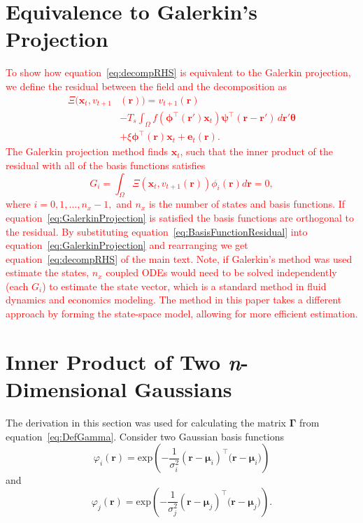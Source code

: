 \documentclass[review,authoryear,3p]{elsarticle}
\newcommand{\dean}[1]{\textcolor{red}{#1}}
\begin{document}
\section{Equivalence to Galerkin's Projection}\label{App:Galerkin}
\dean{To show how equation~\ref{eq:decompRHS} is equivalent to the Galerkin projection, we define the residual between the field and the decomposition as 
\begin{align}\label{eq:BasisFunctionResidual}
	\Xi(\mathbf{x}_t,v_{t+1}&(\mathbf{r})) = v_{t+1}(\mathbf{r}) \nonumber \\
	&- T_s\int_\Omega{f(\boldsymbol{\phi}^{\top}(\mathbf{r}')\mathbf{x}_t )\boldsymbol{\psi}^{\top}(\mathbf{r}-\mathbf{r}') \, d\mathbf{r}'}\boldsymbol{\theta} \nonumber \\
	&+ \xi\boldsymbol{\phi}^{\top}(\mathbf{r})\mathbf{x}_t + \mathbf{e}_t(\mathbf{r}).
\end{align} 
The Galerkin projection method finds $\mathbf{x}_t$, such that the inner product of the residual with all of the basis functions satisfies
\begin{equation}\label{eq:GalerkinProjection}
	G_i = \int_{\Omega}\Xi(\mathbf{x}_t,v_{t+1}(\mathbf{r})) \phi_i(\mathbf{r}) d\mathbf{r} = 0,
\end{equation}
where $i=0,1,\hdots,n_x-1,$ and $n_x$ is the number of states and basis functions. If equation~\ref{eq:GalerkinProjection} is satisfied the basis functions are orthogonal to the residual. By substituting equation~\ref{eq:BasisFunctionResidual} into equation~\ref{eq:GalerkinProjection} and rearranging we get equation~\ref{eq:decompRHS} of the main text. Note, if Galerkin's method was used estimate the states, $n_x$ coupled ODEs would need to be solved independently (each $G_i$) to estimate the state vector, which is a standard method in fluid dynamics and economics modeling. The method in this paper takes a different approach by forming the state-space model, allowing for more efficient estimation. }

\section{Inner Product of Two \emph{n}-Dimensional Gaussians}\label{App:InnerProdOfGaussians}
The derivation in this section was used for calculating the matrix $\mathbf \Gamma$ from equation~\ref{eq:DefGamma}. Consider two Gaussian basis functions
\begin{equation}\label{eq:n_dimensional_Gaussian1}
 \varphi_i(\mathbf r)=\mathrm{exp}\left({-\frac{1}{\sigma_i^2} (\mathbf r-\boldsymbol \mu_i)^\top(\mathbf r-\boldsymbol \mu_i})\right)
\end{equation}
and 
\begin{equation}\label{eq:n_dimensional_Gaussian2}
\varphi_j(\mathbf r)=\mathrm{exp}\left({-\frac{1}{\sigma_j^2} (\mathbf r-\boldsymbol \mu_j)^\top(\mathbf r-\boldsymbol \mu_j})\right).
\end{equation}
\end{document}
